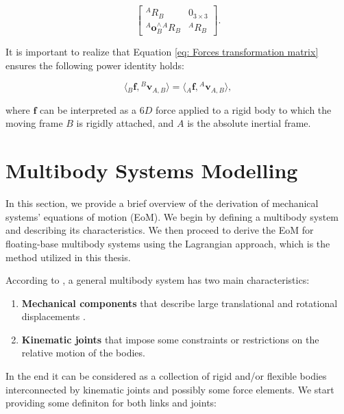     \begin{equation}
    \begin{bmatrix}
    {}^{A} {R}_{B} &  {0}_{3\times3} \\
    {}^{A} \mathbf{o}^{\wedge}_{B} {}^{A} {R}_{B} & {}^{A} {R}_{B}
    \end{bmatrix}.
    \end{equation}

    It is important to realize that Equation \eqref{eq: Forces transformation matrix} ensures the following power identity holds:

    \begin{equation}
    \langle {}_{B} \mathbf{f}, {}^{B} \mathbf{v}_{A,B} \rangle = \langle {}_{A} \mathbf{f}, {}^{A} \mathbf{v}_{A,B} \rangle,
    \end{equation}
    
    where $ \mathbf{f}$ can be interpreted as a $6D$ force applied to a rigid body to which the moving frame $B$ is rigidly attached, and $A$ is the absolute inertial frame.

    \section{Multibody Systems Modelling}
    \label{sec:Multibody Systems Modelling}

    In this section, we provide a brief overview of the derivation of mechanical systems' equations of motion (EoM). We begin by defining a multibody system and describing its characteristics. We then proceed to derive the EoM for floating-base multibody systems using the Lagrangian approach, which is the method utilized in this thesis.

    According to \cite{Flores}, a general multibody system has two main characteristics:

    \begin{enumerate}
    \item \textbf{Mechanical components} that describe large translational and rotational displacements .
    \item \textbf{Kinematic joints} that impose some constraints or restrictions on the relative motion of the bodies.
    \end{enumerate}
    
    In the end it can be considered as a collection of rigid and/or flexible bodies interconnected by kinematic joints and possibly some force elements.
    We start providing some definiton for both links and joints:
    
